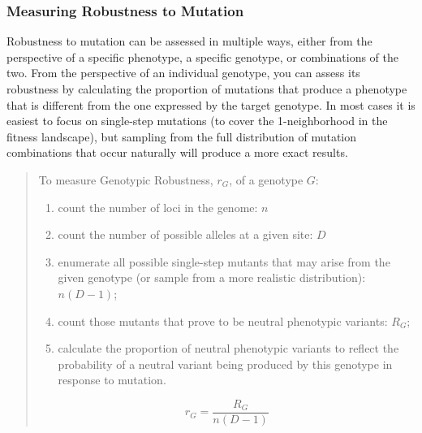 \documentclass[PhD]{msu-thesis}
\begin{document}
\subsubsection{Measuring Robustness to Mutation}
Robustness to mutation can be assessed in multiple ways, either from the perspective of a specific phenotype, a specific genotype, or combinations of the two. From the perspective of an individual genotype, you can assess its robustness by calculating the proportion of mutations that produce a phenotype that is different from the one expressed by the target genotype\cite{andreas_wagner_robustness_2008}. In most cases it is easiest to focus on single-step mutations (to cover the 1-neighborhood in the fitness landscape), but sampling from the full distribution of mutation combinations that occur naturally will produce a more exact results.

\begin{quote}

To measure Genotypic Robustness, $r_G$, of a genotype $G$:
\begin{enumerate}
\item count the number of loci in the genome: $n$
\item count the number of possible alleles at a given site: $D$ 
\item enumerate all possible single-step mutants that may arise from the given genotype (or sample from a more realistic distribution): $n(D-1)$;


\item count those mutants that prove to be neutral phenotypic variants: $R_G$;

\item calculate the proportion of neutral phenotypic variants to reflect the probability of a neutral variant being produced by this genotype in response to mutation. 

\end{enumerate}
\begin{equation}
r_{G} = \frac{R_{G}}{n(D-1)}
\end{equation} 
\end{quote}
\end{document}
